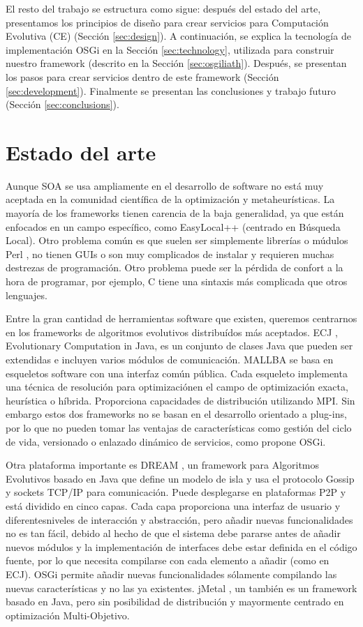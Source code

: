 \documentclass[runningheads]{llncs}
\begin{document}
El resto del trabajo se estructura como sigue: después del estado del arte, presentamos los principios de diseño para crear servicios para Computación Evolutiva (CE) (Sección \ref{sec:design}). A continuación, se explica la tecnología de implementación OSGi en la Sección \ref{sec:technology}, utilizada para construir nuestro framework (descrito en la Sección \ref{sec:osgiliath}). Después, se presentan los pasos para crear servicios dentro de este framework (Sección \ref{sec:development}). Finalmente se presentan las conclusiones y trabajo futuro (Sección \ref{sec:conclusions}).



\section{Estado del arte}
\label{sec:soa}

Aunque SOA se usa ampliamente en el desarrollo de software no está muy aceptada en la comunidad científica de la optimización y metaheurísticas. La mayoría de los frameworks tienen carencia de la baja generalidad, ya que están enfocados en un campo específico, como EasyLocal++ \cite{EASYLOCAL}(centrado en Búsqueda Local). Otro problema común es que suelen ser simplemente librerías o múdulos Perl \cite{PERL}, no tienen GUIs o son muy complicados de instalar y requieren muchas destrezas de programación. Otro problema puede ser la pérdida de confort a la hora de programar, por ejemplo, C tiene una sintaxis más complicada que otros lenguajes.

Entre la gran cantidad de herramientas software que existen, queremos centrarnos en los frameworks de algoritmos evolutivos distribuídos más aceptados. ECJ \cite{ECJ}, Evolutionary Computation in Java, es un conjunto de clases Java que pueden ser extendidas e incluyen varios módulos de comunicación. MALLBA \cite{MALLBA} se basa en esqueletos software con una interfaz común pública. Cada esqueleto implementa una técnica de resolución para optimizaciónen el campo de optimización exacta, heurística o híbrida. Proporciona capacidades de distribución utilizando MPI. Sin embargo estos dos frameworks no se basan en el desarrollo orientado a plug-ins, por lo que no pueden tomar las ventajas de características como gestión del ciclo de vida, versionado o enlazado dinámico de servicios, como propone OSGi.

Otra plataforma importante es DREAM \cite{DREAM}, un framework para Algoritmos Evolutivos basado en Java que define un modelo de isla y usa el protocolo Gossip y sockets TCP/IP para comunicación. Puede desplegarse en plataformas P2P y está dividido en cinco capas. Cada capa proporciona una interfaz de usuario y diferentesniveles de interacción y abstracción, pero añadir nuevas funcionalidades no es tan fácil, debido al hecho de que el sistema debe pararse antes de añadir nuevos módulos y la implementación de interfaces debe estar definida en el código fuente, por lo que necesita compilarse con cada elemento a añadir (como en ECJ). OSGi permite añadir nuevas funcionalidades sólamente compilando las nuevas características y no las ya existentes. jMetal \cite{JMETAL}, un también es un framework basado en Java, pero sin posibilidad de distribución y mayormente centrado en optimización Multi-Objetivo.
\end{document}
